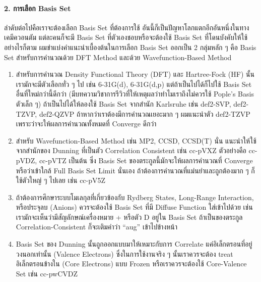 \paragraph{2. การเลือก Basis Set}
%
ลำดับต่อไปคือเราจะต้องเลือก Basis Set ที่ต้องการใช้ อันนี้ก็เป็นปัญหาโลกแตกอีกอันหนึ่งในทางเคมีควอนตัม แต่ละคนก็จะมี Basis Set ที่ตัวเองชอบหรือจะต้องใช้ Basis Set ที่โดนบังคับให้ใช้ อย่างไรก็ตาม ผมขำแบ่งคำแนะนำเบื้องต้นในการเลือก Basis Set ออกเป็น 2 กลุ่มหลัก ๆ คือ Basis Set สำหรับการคำนวณด้วย DFT Method และด้วย Wavefunction-Based Method
%
\begin{enumerate}[topsep=0pt,noitemsep]
  \setlength\itemsep{0.5em}
  \item สำหรับการคำนวณ Density Functional Theory (DFT) และ Hartree-Fock (HF) นั้นเรามักจะมีตัวเลือกทั่ว ๆ ไป เช่น 6-31G(d), 6-31G(d,p) แต่ถ้าเป็นไปได้ก็ไปใช้ Basis Set อื่นที่ใหม่กว่านี้ดีกว่า (มีบทความวิชาการรีวิวที่ให้เหตุผลว่าทำไมเราถึงไม่ควรใช้ Pople's Basis ตัวเล็ก ๆ) ถ้าเป็นไปได้ให้ลองใช้ Basis Set จากสำนัก Karlsruhe เช่น def2-SVP, def2-TZVP, def2-QZVP ถ้าหากว่าเราต้องมีการคำนวณเยอะมาก ๆ ผมแนะนำตัว def2-TZVP เพราะว่าจะให้ผลการคำนวณทั้งหมดที่ Converge ดีกว่า

  \item สำหรับ Wavefunction-Based Method เช่น MP2, CCSD, CCSD(T) นั่น แนะนำให้ใช้จากสำนักของ Dunning ที่เป็นตัว Correlation Consistent เช่น cc-pVXZ ตัวอย่างคือ cc-pVDZ, cc-pVTZ เป็นต้น ซึ่ง Basis Set ของตระกูลนี้มักจะให้ผลการคำนวณที่ Converge หรือว่าเข้าใกล้ Full Basis Set Limit นั่นเอง ถ้าต้องการคำนวณที่แม่นยำและถูกต้องมาก ๆ ก็ใช้ตัวใหญ่ ๆ ไปเลย เช่น cc-pV5Z

  \item ถ้าต้องการศึกษาระบบโมเลกุลที่เกี่ยวข้องกับ Rydberg States, Long-Range Interaction, หรือประจุลบ (Anions) ควรจะต้องใช้ Basis Set ที่มี Diffuse Function ใส่เข้าไปด้วย เช่น เรามักจะเห็นว่ามีสัญลักษณ์เครื่องหมาย + หรือตัว D อยู่ใน Basis Set ถ้าเป็นของตระกูล Correlation-Consistent ก็จะเติมคำว่า \enquote{aug} เข้าไปข้างหน้า

  \item Basis Set ของ Dunning นั้นถูกออกแบบมาให้เหมาะกับการ Correlate แค่อิเล็กตรอนที่อยู่วงนอกเท่านั้น (Valence Electrons) ซึ่งในการใช้งานจริง ๆ นั้นเราควรจะต้อง treat อิเล็กตรอนข้างใน (Core Electrons) แบบ Frozen หรือเราควรจะต้องใช้ Core-Valence Set เช่น cc-pwCVDZ
\end{enumerate}

